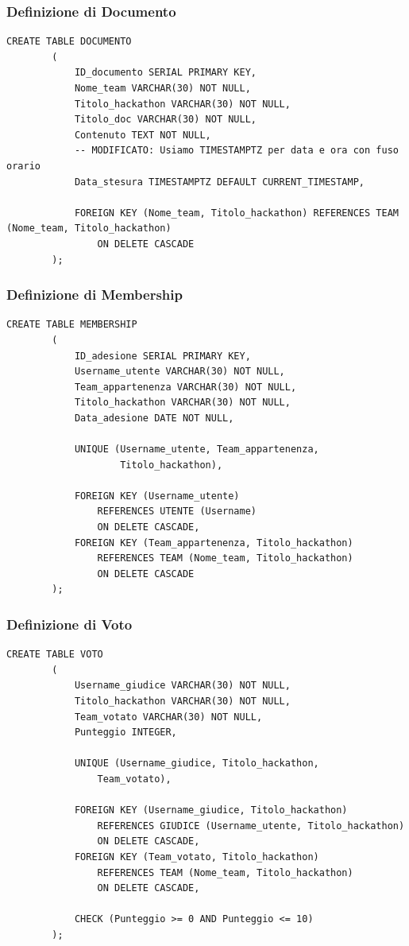 \documentclass[a4paper, 10pt]{article}
\begin{document}
	\subsubsection{Definizione di Documento}
	\begin{lstlisting}[style=sqlstyle]
		CREATE TABLE DOCUMENTO
		(
			ID_documento SERIAL PRIMARY KEY,
			Nome_team VARCHAR(30) NOT NULL,
			Titolo_hackathon VARCHAR(30) NOT NULL,
			Titolo_doc VARCHAR(30) NOT NULL,
			Contenuto TEXT NOT NULL,
			-- MODIFICATO: Usiamo TIMESTAMPTZ per data e ora con fuso orario
			Data_stesura TIMESTAMPTZ DEFAULT CURRENT_TIMESTAMP,

			FOREIGN KEY (Nome_team, Titolo_hackathon) REFERENCES TEAM (Nome_team, Titolo_hackathon)
				ON DELETE CASCADE
		);
	\end{lstlisting}
	\subsubsection{Definizione di Membership}
	\begin{lstlisting}[style=sqlstyle]
		CREATE TABLE MEMBERSHIP
		(
			ID_adesione SERIAL PRIMARY KEY,
			Username_utente VARCHAR(30) NOT NULL,
			Team_appartenenza VARCHAR(30) NOT NULL,
			Titolo_hackathon VARCHAR(30) NOT NULL,
			Data_adesione DATE NOT NULL,
			
			UNIQUE (Username_utente, Team_appartenenza, 
					Titolo_hackathon),
			
			FOREIGN KEY (Username_utente) 
				REFERENCES UTENTE (Username) 
				ON DELETE CASCADE,
			FOREIGN KEY (Team_appartenenza, Titolo_hackathon) 
				REFERENCES TEAM (Nome_team, Titolo_hackathon) 
				ON DELETE CASCADE
		);
	\end{lstlisting}
	\subsubsection{Definizione di Voto}
	\begin{lstlisting}[style=sqlstyle]
		CREATE TABLE VOTO
		(
			Username_giudice VARCHAR(30) NOT NULL,
			Titolo_hackathon VARCHAR(30) NOT NULL,
			Team_votato VARCHAR(30) NOT NULL,
			Punteggio INTEGER,
			
			UNIQUE (Username_giudice, Titolo_hackathon, 
				Team_votato),
				
			FOREIGN KEY (Username_giudice, Titolo_hackathon) 
				REFERENCES GIUDICE (Username_utente, Titolo_hackathon) 
				ON DELETE CASCADE,
			FOREIGN KEY (Team_votato, Titolo_hackathon) 
				REFERENCES TEAM (Nome_team, Titolo_hackathon) 
				ON DELETE CASCADE,
			
			CHECK (Punteggio >= 0 AND Punteggio <= 10)
		);
	\end{lstlisting}
	\newpage
\end{document}
